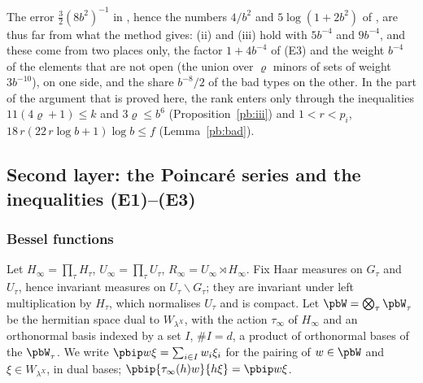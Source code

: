 \documentclass[10pt]{amsart}
\theoremstyle{definition}
\theoremstyle{remark}
\begin{document}
The error $\frac32(8b^2)^{-1}$ in {\cite[Proposition~14.34]{P46}}, hence the numbers $4/b^2$ and
$5\log(1+2b^2)$ of {\cite[Theorem~14.14]{P46}}, are thus far from what the method gives: (ii) and (iii)
hold with $5b^{-4}$ and $9b^{-4}$, and these come from two places only, the factor $1+4b^{-4}$ of
(E3) and the weight $b^{-4}$ of the elements that are not open (the union over $\varrho$ minors of
sets of weight $3b^{-10}$), on one side, and the share $b^{-8}/2$ of the bad types on the other.
In the part of the argument that is proved here, the rank enters only through the inequalities
$11(4\varrho+1)\le k$ and $3\varrho\le b^6$ (Proposition~\ref{pb:iii}) and $1<r<p_i$,
$18\,r(22\,r\log b+1)\log b\le f$ (Lemma~\ref{pb:bad}).

\subsection{Second layer: the Poincar\'e series and the inequalities (E1)--(E3)}\label{pb:ss-layer2}

\subsubsection*{Bessel functions}
Let $H_\infty=\prod_\tau H_\tau$, $U_\infty=\prod_\tau U_\tau$, $R_\infty=U_\infty\rtimes H_\infty$.
Fix Haar measures on $G_\tau$ and $U_\tau$, hence invariant measures on $U_\tau\backslash G_\tau$;
they are invariant under left multiplication by $H_\tau$, which normalises $U_\tau$ and is
compact. Let $\pbW=\bigotimes_\tau\pbW_\tau$ be the hermitian space dual to $W_{\lambda^X}$, with
the action $\tau_\infty$ of $H_\infty$ and an orthonormal basis indexed by a set $I$, $\#I=d$, a
product of orthonormal bases of the $\pbW_\tau$. We write $\pbip w\xi=\sum_{i\in I}w_i\xi_i$ for
the pairing of $w\in\pbW$ and $\xi\in W_{\lambda^X}$, in dual bases; $\pbip{\tau_\infty(h)w}{h\xi}=
\pbip w\xi$.
\end{document}

